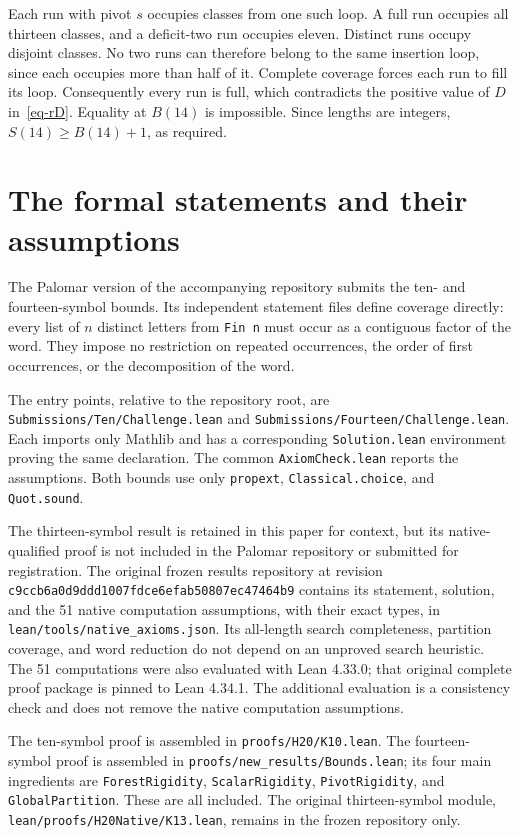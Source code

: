 \documentclass[11pt]{article}
\begin{document}
Each run with pivot $s$ occupies classes from one such loop. A full
run occupies all thirteen classes, and a deficit-two run occupies
eleven. Distinct runs occupy disjoint classes. No two runs can therefore
belong to the same insertion loop, since each occupies more than half
of it. Complete coverage forces each run to fill its loop. Consequently
every run is full, which contradicts the positive value of $D$
in~\eqref{eq-rD}. Equality at $B(14)$ is impossible. Since lengths are
integers, $S(14)\ge B(14)+1$, as required.

\section{The formal statements and their assumptions}
The Palomar version of the accompanying repository submits the ten- and
fourteen-symbol bounds. Its independent statement files define coverage
directly: every list of $n$ distinct letters from \texttt{Fin n} must
occur as a contiguous factor of the word. They impose no restriction on
repeated occurrences, the order of first occurrences, or the decomposition
of the word.

The entry points, relative to the repository root, are
\nolinkurl{Submissions/Ten/Challenge.lean} and
\nolinkurl{Submissions/Fourteen/Challenge.lean}. Each imports only Mathlib
and has a corresponding \nolinkurl{Solution.lean} environment proving
the same declaration. The common \nolinkurl{AxiomCheck.lean} reports the
assumptions. Both bounds use only \texttt{propext},
\nolinkurl{Classical.choice}, and \nolinkurl{Quot.sound}.

The thirteen-symbol result is retained in this paper for context, but
its native-qualified proof is not included in the Palomar repository
or submitted for registration. The original frozen results repository
at revision \nolinkurl{c9ccb6a0d9ddd1007fdce6efab50807ec47464b9}
contains its statement, solution, and the 51 native computation
assumptions, with their exact types, in
\nolinkurl{lean/tools/native_axioms.json}. Its all-length search
completeness, partition coverage, and word reduction do not depend on
an unproved search heuristic. The 51 computations were also evaluated
with Lean 4.33.0; that original complete proof package is pinned to
Lean 4.34.1. The additional evaluation is a consistency check and does
not remove the native computation assumptions.

The ten-symbol proof is assembled in \nolinkurl{proofs/H20/K10.lean}.
The fourteen-symbol proof is assembled in
\nolinkurl{proofs/new_results/Bounds.lean}; its four main ingredients are
\texttt{ForestRigidity}, \texttt{ScalarRigidity}, \texttt{PivotRigidity},
and \texttt{GlobalPartition}. These are all included. The original
thirteen-symbol module, \nolinkurl{lean/proofs/H20Native/K13.lean},
remains in the frozen repository only.
\end{document}
